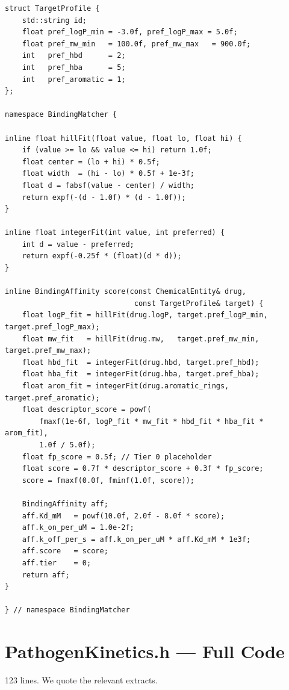 \documentclass[11pt,letterpaper,twoside,openany]{book}
\begin{document}
\begin{lstlisting}
struct TargetProfile {
    std::string id;
    float pref_logP_min = -3.0f, pref_logP_max = 5.0f;
    float pref_mw_min   = 100.0f, pref_mw_max   = 900.0f;
    int   pref_hbd      = 2;
    int   pref_hba      = 5;
    int   pref_aromatic = 1;
};

namespace BindingMatcher {

inline float hillFit(float value, float lo, float hi) {
    if (value >= lo && value <= hi) return 1.0f;
    float center = (lo + hi) * 0.5f;
    float width  = (hi - lo) * 0.5f + 1e-3f;
    float d = fabsf(value - center) / width;
    return expf(-(d - 1.0f) * (d - 1.0f));
}

inline float integerFit(int value, int preferred) {
    int d = value - preferred;
    return expf(-0.25f * (float)(d * d));
}

inline BindingAffinity score(const ChemicalEntity& drug,
                              const TargetProfile& target) {
    float logP_fit = hillFit(drug.logP, target.pref_logP_min, target.pref_logP_max);
    float mw_fit   = hillFit(drug.mw,   target.pref_mw_min,   target.pref_mw_max);
    float hbd_fit  = integerFit(drug.hbd, target.pref_hbd);
    float hba_fit  = integerFit(drug.hba, target.pref_hba);
    float arom_fit = integerFit(drug.aromatic_rings, target.pref_aromatic);
    float descriptor_score = powf(
        fmaxf(1e-6f, logP_fit * mw_fit * hbd_fit * hba_fit * arom_fit),
        1.0f / 5.0f);
    float fp_score = 0.5f; // Tier 0 placeholder
    float score = 0.7f * descriptor_score + 0.3f * fp_score;
    score = fmaxf(0.0f, fminf(1.0f, score));

    BindingAffinity aff;
    aff.Kd_mM   = powf(10.0f, 2.0f - 8.0f * score);
    aff.k_on_per_uM = 1.0e-2f;
    aff.k_off_per_s = aff.k_on_per_uM * aff.Kd_mM * 1e3f;
    aff.score   = score;
    aff.tier    = 0;
    return aff;
}

} // namespace BindingMatcher
\end{lstlisting}

\chapter{PathogenKinetics.h --- Full Code}
\label{ch:pk-line}

123 lines. We quote the relevant extracts.
\end{document}
